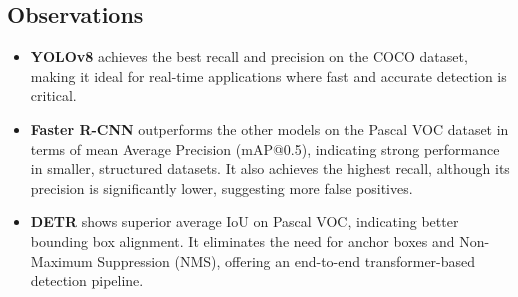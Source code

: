 \documentclass[12pt,a4paper]{article}
\begin{document}
\subsection{Observations}

\begin{itemize}
    \item \textbf{YOLOv8} achieves the best recall and precision on the COCO dataset, making it ideal for real-time applications where fast and accurate detection is critical.
    
    \item \textbf{Faster R-CNN} outperforms the other models on the Pascal VOC dataset in terms of mean Average Precision (mAP@0.5), indicating strong performance in smaller, structured datasets. It also achieves the highest recall, although its precision is significantly lower, suggesting more false positives.
    
    \item \textbf{DETR} shows superior average IoU on Pascal VOC, indicating better bounding box alignment. It eliminates the need for anchor boxes and Non-Maximum Suppression (NMS), offering an end-to-end transformer-based detection pipeline.
\end{itemize}
\end{document}
